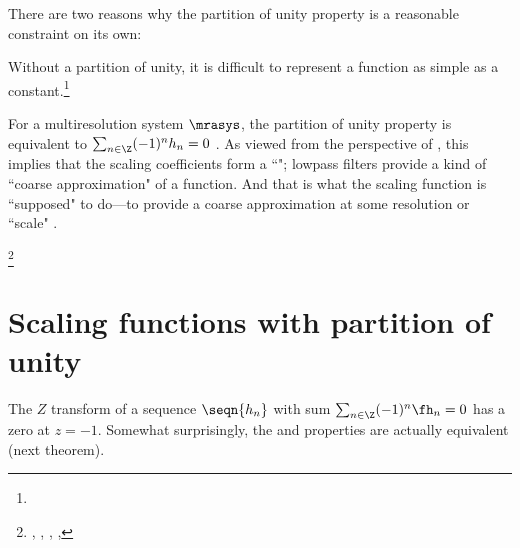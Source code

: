 There are two reasons why the partition of unity property is a reasonable
constraint on its own:
\begin{liste}
   \item Without a partition of unity, it is difficult to represent a function as simple as a
         constant.\footnote{}

  \item For a multiresolution system $\mrasys$, the partition of unity property is equivalent to
        $\sum_{n\in\Z} (-1)^n h_n = 0$ .
        As viewed from the perspective of  ,
        this implies that the scaling coefficients form a ``";
        lowpass filters provide a kind of ``coarse approximation"
        of a function. And that is what the scaling function is ``supposed" to do---to provide a coarse approximation
        at some resolution or ``scale" .
\end{liste}

\begin{definition}
\footnote{
  ,
  ,
  ,
  ,
  }
\label{def:pun}
\end{definition}

\section{Scaling functions with partition of unity}

The $Z$ transform  of a sequence $\seqn{h_n}$
with sum $\sum_{n\in\Z} (-1)^n\fh_n=0$ has a zero at $z=-1$.
Somewhat surprisingly, the  and
 properties are actually equivalent (next theorem).

